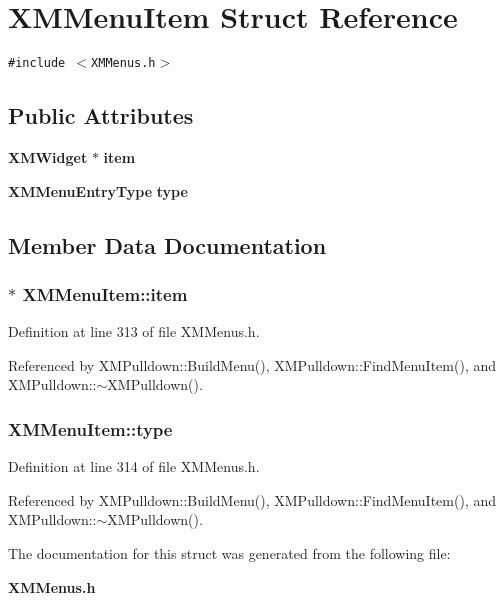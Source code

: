 \section{XMMenu\-Item  Struct Reference}
\label{structXMMenuItem}
{\tt \#include $<$XMMenus.h$>$}

\subsection*{Public Attributes}
\begin{CompactItemize}
\item 
{\bf XMWidget} $\ast$ {\bf item}
\item 
{\bf XMMenu\-Entry\-Type} {\bf type}
\end{CompactItemize}


\subsection{Member Data Documentation}
\subsubsection{$\ast$ XMMenu\-Item::item}\label{structXMMenuItem_m0}




Definition at line 313 of file XMMenus.h.

Referenced by XMPulldown::Build\-Menu(), XMPulldown::Find\-Menu\-Item(), and XMPulldown::$\sim$XMPulldown().
\subsubsection{ XMMenu\-Item::type}\label{structXMMenuItem_m1}




Definition at line 314 of file XMMenus.h.

Referenced by XMPulldown::Build\-Menu(), XMPulldown::Find\-Menu\-Item(), and XMPulldown::$\sim$XMPulldown().

The documentation for this struct was generated from the following file:\begin{CompactItemize}
\item 
{\bf XMMenus.h}\end{CompactItemize}
